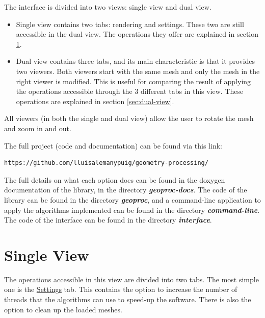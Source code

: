 \documentclass[12pt]{article}
\newcommand \dir[1] {\textbf{\textit{#1}}}
\newcommand \tabbox[1] {\underline{#1}}
\begin{document}
The interface is divided into two views: single view and dual view.
\begin{itemize}
	\item Single view contains two tabs: rendering and settings.
	These two are still accessible in the dual view. The operations
	they offer are explained in section \ref{sec:single-view}.
	
	\item Dual view contains three tabs, and its main characteristic
	is that it provides two viewers. Both viewers start with the same
	mesh and only the mesh in the right viewer is modified. This is
	useful for comparing the result of applying the operations accessible
	through the 3 different tabs in this view. These operations are
	explained in section \ref{sec:dual-view}.
\end{itemize}

All viewers (in both the single and dual view) allow the user to rotate
the mesh and zoom in and out.

\hfill

The full project (code and documentation) can be found via this link:
\begin{verbatim}
https://github.com/lluisalemanypuig/geometry-processing/
\end{verbatim}
The full details on what each option does can be found in the doxygen
documentation of the library, in the directory \dir{geoproc-docs}.
The code of the library can be found in the directory \dir{geoproc},
and a command-line application to apply the algorithms implemented can
be found in the directory \dir{command-line}. The code of the
interface can be found in the directory \dir{interface}.

\section{Single View}
\label{sec:single-view}

The operations accessible in this view are divided into two tabs.
The most simple one is the \tabbox{Settings} tab. This contains the
option to increase the number of threads that the algorithms can use
to speed-up the software. There is also the option to clean up the
loaded meshes.

\hfill
\end{document}
